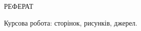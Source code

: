 {
    \thispagestyle{empty}
    \begin{center}
        \uppercase{Реферат}
    \end{center}
    \vspace{\baselineskip}


    
    Курсова робота:  сторінок, \totfig{} рисунків,  джерел.

    \vspace{\baselineskip}

    \uppercase{ }

    \vspace{\baselineskip}
    
}